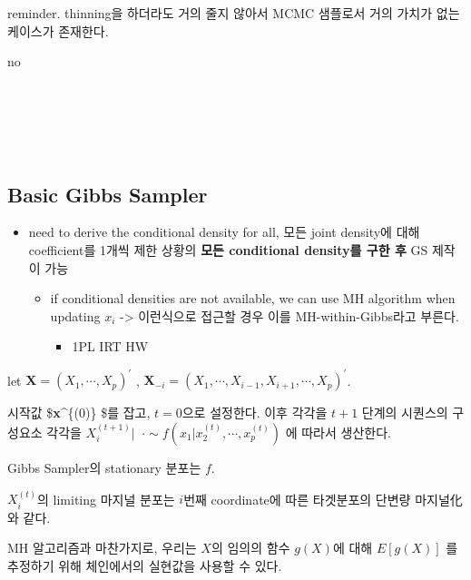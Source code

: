 \documentclass[
]{book}
\providecommand{\tightlist}{%
  \setlength{\itemsep}{0pt}\setlength{\parskip}{0pt}}
\begin{document}
reminder. thinning을 하더라도 거의 줄지 않아서 MCMC 샘플로서 거의 가치가 없는 케이스가 존재한다.

no

~\\
~\\
~\\
~\\

\hypertarget{basic-gibbs-sampler}{%
\subsection{Basic Gibbs Sampler}\label{basic-gibbs-sampler}}

\begin{itemize}
\tightlist
\item
  need to derive the conditional density for all, 모든 joint density에 대해 coefficient를 1개씩 제한 상황의 \textbf{모든 conditional density를 구한 후} GS 제작이 가능

  \begin{itemize}
  \tightlist
  \item
    if conditional densities are not available, we can use MH algorithm when updating \(x_i\) -\textgreater{} 이런식으로 접근할 경우 이를 MH-within-Gibbs라고 부른다.

    \begin{itemize}
    \tightlist
    \item
      1PL IRT HW
    \end{itemize}
  \end{itemize}
\end{itemize}

let \(\textbf {X} = (X_1 , \cdots, X_p )^{'}\) , \(\textbf {X}_{-i} = (X_1 , \cdots, X_{i-1}, X_{i+1}, \cdots, X_p )^{'}\).

시작값 \$\textbf {x}\^{}\{(0)\} \$를 잡고, \(t=0\)으로 설정한다. 이후 각각을 \(t+1\) 단계의 시퀀스의 구성요소 각각을 \(X_i^{(t+1)} \vert \; \; \cdot \sim f \left( x_1 \rvert x_2^{(t)}, \cdots, x_p^{(t)} \right)\) 에 따라서 생산한다.

Gibbs Sampler의 stationary 분포는 \(f\).

\(X_i^{(t)}\)의 limiting 마지널 분포는 \(i\)번째 coordinate에 따른 타겟분포의 단변량 마지널化와 같다.

MH 알고리즘과 마찬가지로, 우리는 \(X\)의 임의의 함수 \(g(X)\)에 대해 \(E \left[ g(X) \right]\) 를 추정하기 위해 체인에서의 실현값을 사용할 수 있다.

~\\
~\\
\end{document}
